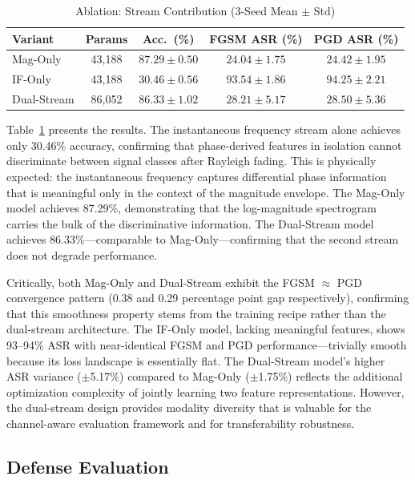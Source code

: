 \documentclass[conference]{IEEEtran}
\begin{document}
\begin{table}[t]
\centering
\caption{Ablation: Stream Contribution (3-Seed Mean $\pm$ Std)}\label{tab:ablation}
\begin{tabular}{lcccc}
\toprule
\textbf{Variant} & \textbf{Params} & \textbf{Acc.\ (\%)} & \textbf{FGSM ASR (\%)} & \textbf{PGD ASR (\%)} \\
\midrule
Mag-Only   & 43,188 & $87.29 \pm 0.50$ & $24.04 \pm 1.75$ & $24.42 \pm 1.95$ \\
IF-Only    & 43,188 & $30.46 \pm 0.56$ & $93.54 \pm 1.86$ & $94.25 \pm 2.21$ \\
Dual-Stream & 86,052 & $86.33 \pm 1.02$ & $28.21 \pm 5.17$ & $28.50 \pm 5.36$ \\
\bottomrule
\end{tabular}
\end{table}

Table~\ref{tab:ablation} presents the results. The instantaneous frequency stream alone achieves only 30.46\% accuracy, confirming that phase-derived features in isolation cannot discriminate between signal classes after Rayleigh fading. This is physically expected: the instantaneous frequency captures differential phase information that is meaningful only in the context of the magnitude envelope. The Mag-Only model achieves 87.29\%, demonstrating that the log-magnitude spectrogram carries the bulk of the discriminative information. The Dual-Stream model achieves 86.33\%---comparable to Mag-Only---confirming that the second stream does not degrade performance.

Critically, both Mag-Only and Dual-Stream exhibit the FGSM $\approx$ PGD convergence pattern (0.38 and 0.29 percentage point gap respectively), confirming that this smoothness property stems from the training recipe rather than the dual-stream architecture. The IF-Only model, lacking meaningful features, shows 93--94\% ASR with near-identical FGSM and PGD performance---trivially smooth because its loss landscape is essentially flat. The Dual-Stream model's higher ASR variance ($\pm$5.17\%) compared to Mag-Only ($\pm$1.75\%) reflects the additional optimization complexity of jointly learning two feature representations. However, the dual-stream design provides modality diversity that is valuable for the channel-aware evaluation framework and for transferability robustness.

\subsection{Defense Evaluation}
\end{document}
